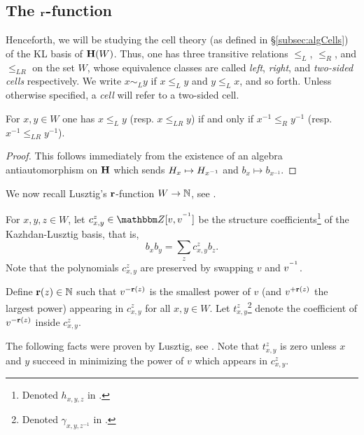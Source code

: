 \subsection{The $\mathbf{r}$-function}
\label{subsec:afunc}

Henceforth, we will be studying the cell theory (as defined in \S\ref{subsec:algCells}) of the KL basis of ${\mathbf H}(W)$. Thus, one has three transitive relations $\le_{L}$, $\le_{R}$, and $\le_{LR}$ on
the set $W$, whose equivalence classes are called \emph{left}, \emph{right}, and \emph{two-sided cells} respectively. We write $x \sim_L y$ if $x \le_L y$ and $y \le_L x$, and so forth.
Unless otherwise specified, a \emph{cell} will refer to a two-sided cell.

\begin{lemma} For $x, y \in W$ one has $x \le_L y$ (resp. $x \le_{LR} y$) if and only if $x^{-1} \le_R y^{-1}$ (resp. $x^{-1} \le_{LR} y^{-1}$). \end{lemma}

\begin{proof} This follows immediately from the existence of an algebra antiautomorphism on ${\mathbf H}$ which sends $H_x\mapsto H_{x^{-1}}$ and $b_x\mapsto b_{x^{-1}}$. \end{proof}
	
We now recall Lusztig's $\mathbf{r}$-function $W \rightarrow {\mathbb{N}}$, see \cite[Section 13]{LuszUnequal14}.

\begin{defn}\label{def:a} For $x,y,z\in W$, let $c^z_{x,y} \in \Z[v,v^{\inv}]$ be the structure coefficients\footnote{Denoted $h_{x,y,z}$ in \cite[Section 13]{LuszUnequal14}.} of the
Kazhdan-Lusztig basis, that is, $$b_x b_y=\sum_{z}c^z_{x,y} b_z.$$ Note that the polynomials $c^z_{x,y}$ are preserved by swapping $v$ and $v^{^{-1}}$.

Define $\mathbf{r}(z) \in {\mathbb{N}}$ such that $v^{-\mathbf{r}(z)}$ is the smallest power of $v$ (and $v^{+\mathbf{r}(z)}$ the largest power) appearing in $c^z_{x,y}$ for all $x,y \in W$. Let $t^z_{x,y}$\footnote{Denoted $\gamma_{x,y,z^{-1}}$ in \cite[Section 13]{LuszUnequal14}.} denote the coefficient of $v^{-\mathbf{r}(z)}$ inside $c^z_{x,y}$.  \end{defn}

The following facts were proven by Lusztig, see \cite[Section 14]{LuszUnequal14}. Note that $t^z_{x,y}$ is zero unless $x$ and $y$ succeed in minimizing the power of $v$ which appears in $c^z_{x,y}$.



